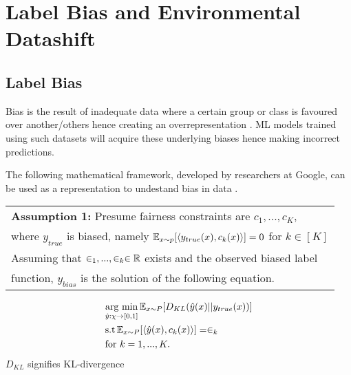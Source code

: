 \chapter{Label Bias and Environmental Datashift}
\section*{Label Bias}
Bias is the result of inadequate data where a certain group or class is favoured over another/others hence creating an overrepresentation \cite{Jiang}\cite{saria2019tutorial}.
ML models trained using such datasets will acquire these underlying biases hence making incorrect predictions.

The following mathematical framework, developed by researchers at Google, can be used as a representation to undestand bias in data \cite{Jiang}.

\bigskip
\begin{center}
    \begin{tabular}{l}
        \textbf{Assumption 1: }Presume fairness constraints are $c_1, ..., c_K$,\\
        where $y_{true}$ is biased, namely $\operatorname{\mathbb{E}}_{x\sim p}[\langle y_{true}(x), c_k(x)\rangle] = 0$ for $k \in [K]$\\
        Assuming that $\in_1, ..., \in_k \in \mathbb{R}$ exists and the observed biased label \\
        function, $y_{bias}$ is the solution of the following equation.
    \end{tabular}

    \begin{equation}
        \label{eq:assumption}
        \begin{split}
            & \underset{\hat{y}:\chi\rightarrow[0,1]}{\text{arg min}}  \operatorname{\mathbb{E}}_{x\sim P}[D_{KL}(\hat{y}(x)||y_{true}(x))]\\
            & \text{s.t} \operatorname{\mathbb{E}}_{x\sim P}[\langle\hat{y}(x),c_k(x)\rangle] = \in_k \\
            & \text{for } k = 1, ..., K.
        \end{split}
    \end{equation}
    $D_{KL}$ signifies KL-divergence
\end{center}

